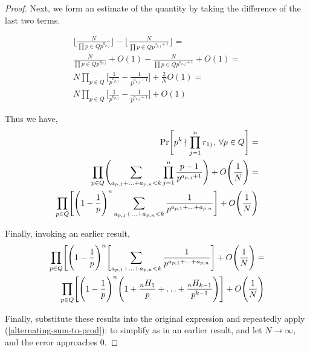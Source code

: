 \documentclass[10pt,a4paper]{article}
\theoremstyle{definition}
\theoremstyle{remark}
\begin{document}
\begin{proof}
		  Next, we form an estimate of the quantity by taking the difference of the last two terms. 
		  
		  \begin{align}
		  	\Biggl\lfloor \frac{N}{\prod {p\in Q} p^{a_{p,j}}} \Biggr\rfloor - \Biggl\lfloor \frac{N}{\prod {p\in Q} p^{a_{p,j}+1}} \Biggr\rfloor =\\
		  	  \frac{N}{\prod {p\in Q} p^{a_{p,j}}} + O(1) -  \frac{N}{\prod {p\in Q} p^{a_{p,j}+1}} + O(1) =\\
		  	   N\prod_ {p\in Q}\Biggl[ \frac{1}{ p^{a_{p,j}}}  -  \frac{1}{ p^{a_{p,j}+1}} \Biggr]+ \frac{2}{N}O(1)=\\
		  	   N\prod_ {p\in Q}\Biggl[ \frac{1}{ p^{a_{p,j}}}  -  \frac{1}{ p^{a_{p,j}+1}} \Biggr]+ O(1)
		  \end{align}
		  
		  Thus we have,
		  \begin{align}
		  	\Pr\Biggl[p^k\nmid \prod_{j=1}^{n}r_{1j},\: \forall p\in Q\Biggr] =\\
		  	 \prod_{p\in Q} \Biggl(\sum_{a_{p,1}+\mathellipsis+a_{p,n}<k}\prod_{j=1}^{n}\frac{p-1}{p^{a_{p,j}+1}}\Biggr)+O\Biggl(\frac{1}{N}\Biggr) = \\
		  	 \prod_{p\in Q}\Biggl[\Biggl(1-\frac{1}{p}\Biggr)^n\sum_{a_{p,1}+\mathellipsis+a_{p,n}<k}\frac{1}{p^{a_{p,1}+\mathellipsis+a_{p,n}}}\Biggr]+O\Biggl(\frac{1}{N}\Biggr)
		  \end{align}
		  
		  Finally, invoking an earlier result,  
		  \begin{align}
		  	\prod_{p\in Q}\Biggl[\Biggl(1-\frac{1}{p}\Biggr)^n\Biggl[\sum_{a_{p,1}+\mathellipsis+a_{p,n}<k}\frac{1}{p^{a_{p,1}+\mathellipsis+a_{p,n}}}\Biggr]+O\Biggl(\frac{1}{N}\Biggr)=\\
		  	 \prod_{p\in Q}\Biggl[\Biggl(1-\frac{1}{p}\Biggr)^n\Biggl(1+\frac{_nH_1}{p}+\mathellipsis+\frac{_nH_{k-1}}{p^{k-1}}\Biggr)\Biggr]+O\Biggl(\frac{1}{N}\Biggr)
		  \end{align}
		  
		  Finally, substitute these results into the original expression and repeatedly apply (\cref{alternating-sum-to-prod}): to simplify as in an earlier result, and let \(N\to \infty\), and the error approaches 0. 
	\end{proof}

\end{document}
